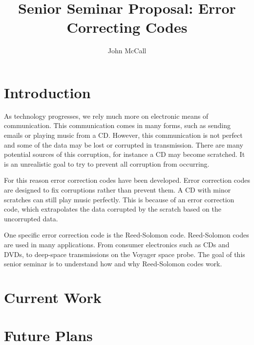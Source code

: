 \documentclass{article}
\author{John McCall}
\title{Senior Seminar Proposal: Error Correcting Codes}
\begin{document}
\maketitle

\section{Introduction}
As technology progresses, we rely much more on electronic means of communication.
This communication comes in many forms, such as sending emails or playing music 
from a CD. However, this communication is not perfect and some of the data
may be lost or corrupted in transmission. There are many potential sources
of this corruption, for instance a CD may become scratched. It is an unrealistic
goal to try to prevent all corruption from occurring.

For this reason error correction codes have been developed. Error correction
codes are designed to fix corruptions rather than prevent them. A CD with
minor scratches can still play music perfectly. This is because of
an error correction code, which extrapolates the data corrupted by the
scratch based on the uncorrupted data.

One specific error correction code is the Reed-Solomon code. Reed-Solomon codes
are used in many applications. From consumer electronics such as CDs and DVDs,
to deep-space transmissions on the Voyager space probe. The goal of this
senior seminar is to understand how and why Reed-Solomon codes work. 

\section{Current Work}

\section{Future Plans}
\end{document}
